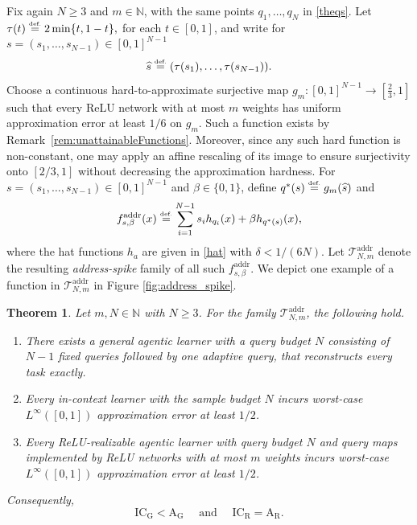\documentclass{article}
\newtheorem{theorem}{Theorem}[section]
\newcommand{\eqdef }{\ensuremath{\stackrel{\mbox{\upshape\tiny def.}}{=}}}
\newcommand{\ICG}{\mathrm{IC_G}}
\newcommand{\ICR}{\mathrm{IC_R}}
\newcommand{\AG}{\mathrm{A_G}}
\newcommand{\AR}{\mathrm{A_R}}
\begin{document}
Fix again $N\ge 3$ and $m\in\mathbb N$, with the same points $q_1,\dots,q_N$ in \eqref{theqs}. %
Let
$
\tau(t)\eqdef 2\min\{t,1-t\},
$ for each $t\in[0,1]$, 
and write for $s=(s_1,\dots,s_{N-1})\in[0,1]^{N-1}$
\begin{equation} \label{hats}
    \widehat s\eqdef  (\tau(s_1),\dots,\tau(s_{N-1})).
\end{equation}
Choose a continuous hard-to-approximate surjective map
$
g_m:[0,1]^{N-1}\to\left[\frac23,1\right]
$
such that every ReLU network with at most $m$ weights has uniform approximation error at least
$1/6$ on $g_m$. Such a function exists by Remark~\ref{rem:unattainableFunctions}. Moreover, since any such hard function is non-constant, one may apply an affine rescaling of its image to ensure surjectivity onto $[2/3,1]$ without decreasing the approximation hardness. 
For $s=(s_1,\dots,s_{N-1})\in[0,1]^{N-1}$ and $\beta\in\{0,1\}$, define
$
q^\ast(s)\eqdef g_m(\widehat s)
$
and
\begin{equation} \label{eq:addrtasks}
    f^{\mathrm{addr}}_{s,\beta}(x)
    \eqdef 
    \sum_{i=1}^{N-1} s_i h_{q_i}(x)
    +
    \beta h_{q^\ast(s)}(x),
\end{equation}
where the hat functions $h_a$ are given in \eqref{hat} with $\delta<1/(6N)$.
Let \(\mathcal T_{N,m}^{\mathrm{addr}}\) denote the resulting \emph{address-spike} family of all such $f^{\mathrm{addr}}_{s,\beta}$. We depict one example of a function in \(\mathcal T_{N,m}^{\mathrm{addr}}\) in Figure \ref{fig:address_spike}.

\begin{theorem}
\label{thm:address}
Let $m,N\in\mathbb{N}$ with $N\geq 3$.
For the family $\mathcal{T}_{N,m}^{\mathrm{addr}}$, the following hold.
\begin{enumerate}
    \item[\rm (i)] %
    There exists a general agentic learner with a query budget $N$ consisting of $N-1$ fixed queries followed by one adaptive query, that reconstructs every task exactly.
    \item[\rm (ii)] Every in-context learner with the sample budget $N$ incurs worst-case
    $L^\infty([0,1])$ approximation error at least $1/2$.
    \item[(iii)] Every ReLU-realizable agentic learner with query budget \(N\) and query maps implemented by ReLU networks with at most $m$ weights incurs worst-case 
    \(L^\infty([0,1])\) approximation error at least \(1/2\). 
\end{enumerate}
Consequently, 
\begin{equation*}
    \ICG<\AG \quad\text{ and }\quad \ICR=\AR.
\end{equation*}
\end{theorem}
\end{document}
